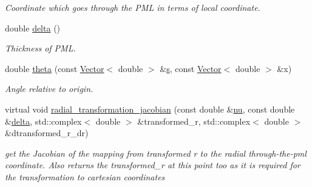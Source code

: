 \begin{DoxyCompactItemize}
\begin{DoxyCompactList}\small\item\em Coordinate which goes through the P\+ML in terms of local coordinate. \end{DoxyCompactList}\item 
double \hyperlink{classoomph_1_1AnnularFromLocalCoordinatePMLElement_affe7de11a2275aac57b0ea2c0594ce7d}{delta} ()
\begin{DoxyCompactList}\small\item\em Thickness of P\+ML. \end{DoxyCompactList}\item 
double \hyperlink{classoomph_1_1AnnularFromLocalCoordinatePMLElement_ae9f56654db4d7979163db0529d9a1408}{theta} (const \hyperlink{classoomph_1_1Vector}{Vector}$<$ double $>$ \&\hyperlink{cfortran_8h_ab7123126e4885ef647dd9c6e3807a21c}{s}, const \hyperlink{classoomph_1_1Vector}{Vector}$<$ double $>$ \&x)
\begin{DoxyCompactList}\small\item\em Angle relative to origin. \end{DoxyCompactList}\item 
virtual void \hyperlink{classoomph_1_1AnnularFromLocalCoordinatePMLElement_ab44027b0ebf468154752cc09d46d3a5d}{radial\+\_\+transformation\+\_\+jacobian} (const double \&\hyperlink{classoomph_1_1AnnularFromLocalCoordinatePMLElement_a161e427b6f1fc6349b9667caf346cf8a}{nu}, const double \&\hyperlink{classoomph_1_1AnnularFromLocalCoordinatePMLElement_affe7de11a2275aac57b0ea2c0594ce7d}{delta}, std\+::complex$<$ double $>$ \&transformed\+\_\+r, std\+::complex$<$ double $>$ \&dtransformed\+\_\+r\+\_\+dr)
\begin{DoxyCompactList}\small\item\em get the Jacobian of the mapping from transformed r to the radial through-\/the-\/pml coordinate. Also returns the transformed\+\_\+r at this point too as it is required for the transformation to cartesian coordinates \end{DoxyCompactList}\end{DoxyCompactItemize}
